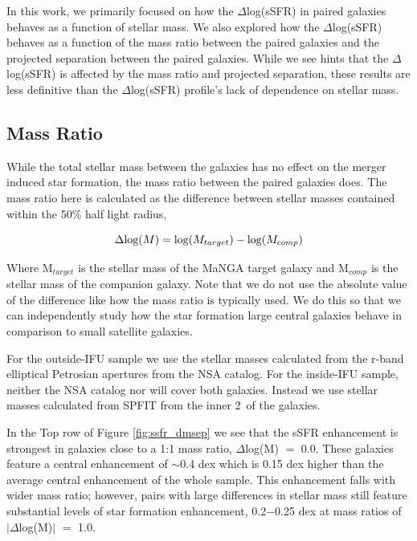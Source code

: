 \documentclass[iop,revtex4,twocolumn,apj,numberedappendix,appendixfloats]{emulateapj}
\begin{document}
In this work, we primarily focused on how the $\Delta$log(sSFR) in paired galaxies behaves as a function of stellar mass. We also explored how the $\Delta$log(sSFR) behaves as a function of the mass ratio between the paired galaxies and the projected separation between the paired galaxies. While we see hints that the $\Delta$log(sSFR) is affected by the mass ratio and projected separation, these results are less definitive than the $\Delta$log(sSFR) profile's lack of dependence on stellar mass. 


\subsection{Mass Ratio}
While the total stellar mass between the galaxies has no effect on the merger induced star formation, the mass ratio between the paired galaxies does. The mass ratio here is calculated as the difference between stellar masses contained within the 50\% half light radius, 

\begin{equation}
\Delta {\rm log}(M) = {\rm log}(M_{target}) - {\rm log}(M_{comp}) 
\end{equation}

Where M$_{target}$ is the stellar mass of the MaNGA target galaxy and M$_{comp}$ is the stellar mass of the companion galaxy. Note that we do not use the absolute value of the difference like how the mass ratio is typically used. We do this so that we can independently study how the star formation large central galaxies behave in comparison to small satellite galaxies.

For the outside-IFU sample we use the stellar masses calculated from the r-band elliptical Petrosian apertures from the NSA catalog. For the inside-IFU sample, neither the NSA catalog nor \citet{Mendel:2014} will cover both galaxies. Instead we use stellar masses calculated from {\sc SPFIT} from the inner 2\arcsec\ of the galaxies. 

In the Top row of Figure \ref{fig:ssfr_dmsep} we see that the sSFR enhancement is strongest in galaxies close to a 1:1 mass ratio, $\Delta$log(M) $=$ 0.0. These galaxies feature a central enhancement of $\sim$0.4 dex which is 0.15 dex higher than the average central enhancement of the whole sample. This enhancement falls with wider mass ratio; however, pairs with large differences in stellar mass still feature substantial levels of star formation enhancement, 0.2$-$0.25 dex at mass ratios of $|\Delta$log(M)$|$ $=$ 1.0.
\end{document}
